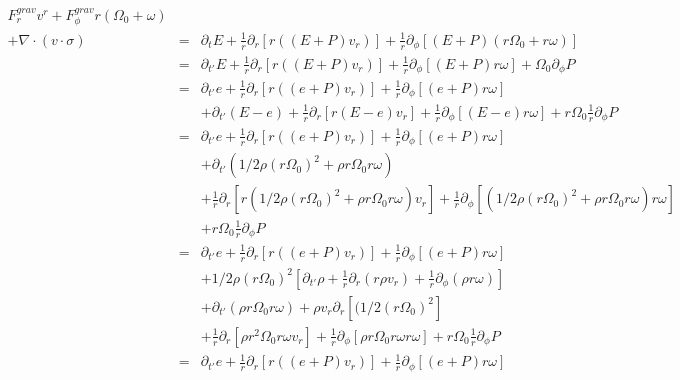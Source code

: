 \documentclass{article}
\begin{document}
\begin{eqnarray*}
  F^{grav}_rv^r+ F^{grav}_{\phi}r( \Omega_0
  + \omega) &&\\
  + \nabla \cdot(v\cdot \sigma)  &=&
  \partial_t E +\frac{1}{r}\partial_r \left[r((E+P)v_r )\right]+\frac{1}{r}\partial_{\phi} \left[(E+P)(r \Omega_0 + r \omega) \right]  \\
                   &=& \partial_{t'} E +\frac{1}{r}\partial_r \left[r((E+P)v_r )\right]+\frac{1}{r}\partial_{\phi} \left[(E+P)r\omega \right]+  \Omega_0 \partial_{\phi} P   \\
                   &=& \partial_{t'} e +\frac{1}{r}\partial_r \left[r((e+P)v_r )\right]+\frac{1}{r}\partial_{\phi} \left[(e+P)r\omega \right] \\
                   &&+ \partial_{t'} (E-e) +\frac{1}{r}\partial_r \left[r(E-e)v_r \right]+\frac{1}{r}\partial_{\phi} \left[(E-e)r\omega\right] + r \Omega_0 \frac{1}{r}\partial_{\phi} P  \\
                   &=& \partial_{t'} e +\frac{1}{r}\partial_r \left[r((e+P)v_r )\right]+\frac{1}{r}\partial_{\phi} \left[(e+P)r\omega\right] \\
                   &&+ \partial_{t'} (1/2 \rho (r\Omega_0)^2+\rho r\Omega_0 r\omega) \\
                   &&+\frac{1}{r}\partial_r \left[r(1/2 \rho (r\Omega_0)^2+\rho r\Omega_0 r\omega)v_r \right]+\frac{1}{r}\partial_{\phi} \left[(1/2 \rho (r\Omega_0)^2+\rho r\Omega_0 r\omega)r\omega\right] \\
                   &&+ r \Omega_0 \frac{1}{r}\partial_{\phi} P \\
                   &=& \partial_{t'} e +\frac{1}{r}\partial_r \left[r((e+P)v_r)\right]+\frac{1}{r}\partial_{\phi} \left[(e+P)r\omega \right] \\
                   &&+ 1/2 \rho (r \Omega_0)^2\left[\partial_{t'} \rho +\frac{1}{r}\partial_r (r \rho v_r) +\frac{1}{r} \partial_{\phi}(\rho r\omega)\right] \\
                   &&+  \partial_{t'}(\rho r\Omega_0 r\omega) + \rho v_r \partial_r \left[(1/2 (r\Omega_0)^2\right]\\
                   &&+\frac{1}{r}\partial_r \left[\rho r^2\Omega_0 r\omega v_r \right]+\frac{1}{r}\partial_{\phi} \left[\rho r\Omega_0 r\omega r\omega\right]  + r \Omega_0 \frac{1}{r}\partial_{\phi} P \\
                   &=& \partial_{t'} e +\frac{1}{r}\partial_r \left[r((e+P)v_r )\right]+\frac{1}{r}\partial_{\phi} \left[(e+P)r\omega\right] \\

\end{eqnarray*}
\end{document}
